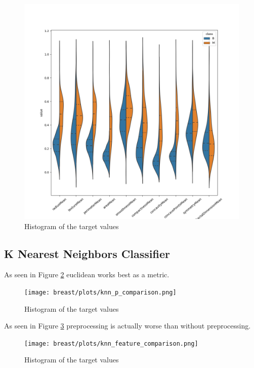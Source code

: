 \begin{figure}[H]
  \begin{center}
    \includegraphics[width=0.8\linewidth]{breast/plots/violinplot.png}
    \caption{Histogram of the target values}
    \label{fig:breast-vionline1}
  \end{center}
\end{figure}

\subsection{K Nearest Neighbors Classifier}



As seen in Figure \ref{fig:breast-knn-metrics} euclidean works best as a metric.

\begin{figure}[H]
  \begin{center}
    \texttt{[image: breast/plots/knn\_p\_comparison.png]}
    \caption{Histogram of the target values}
    \label{fig:breast-knn-metrics}
  \end{center}
\end{figure}

As seen in Figure \ref{fig:breast-knn-comparison} preprocessing is actually worse than without preprocessing.

\begin{figure}[H]
  \begin{center}
    \texttt{[image: breast/plots/knn\_feature\_comparison.png]}
    \caption{Histogram of the target values}
    \label{fig:breast-knn-comparison}
  \end{center}
\end{figure}

